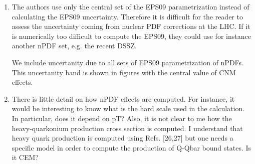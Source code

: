 \documentclass[aps,prc,preprint,superscriptaddress,showpacs,showkeys]{revtex4-1}
\begin{document}
\begin{enumerate}
\item { \color{red} The authors use only the central set of the EPS09 parametrization
instead of calculating the EPS09 uncertainty. Therefore it is
difficult for the reader to assess the uncertainty coming from nuclear
PDF corrections at the LHC. If it is numerically too difficult to
compute the EPS09, they could use for instance another nPDF set, e.g.
the recent DSSZ.}

{\color{blue} We include uncertanity due to all sets of EPS09 parametrization of nPDFs. This
uncertanity band is shown in figures with the central value of CNM effects.} 

\item { \color{red} There is little detail on how nPDF effects are computed. For
instance, it would be interesting to know what is the hard scale used
in the calculation. In particular, does it depend on pT? Also, it is
not clear to me how the heavy-quarkonium production cross section is
computed. I understand that heavy quark production is computed using
Refs. [26,27] but one needs a specific model in order to compute the
production of Q-Qbar bound states. Is it CEM?}

{\color{blue} 






}
\end{enumerate}
\end{document}
